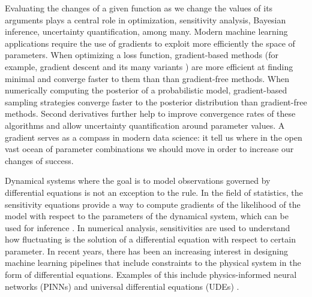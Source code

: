 Evaluating the changes of a given function as we change the values of its arguments plays a central role in optimization, sensitivity analysis, Bayesian inference, uncertainty quantification, among many. 
Modern machine learning applications require the use of gradients to exploit more efficiently the space of parameters. 
When optimizing a loss function, gradient-based methods (for example, gradient descent and its many variants \cite{ruder2016overview-gradient-descent}) are more efficient at finding minimal and converge faster to them than than gradient-free methods.
When numerically computing the posterior of a probabilistic model, gradient-based sampling strategies converge faster to the posterior distribution than gradient-free methods. 
Second derivatives further help to improve convergence rates of these algorithms and allow uncertainty quantification around parameter values.
A gradient serves as a compass in modern data science: it tell us where in the open vast ocean of parameter combinations we should move in order to increase our changes of success.  

Dynamical systems where the goal is to model observations governed by differential equations is not an exception to the rule.
In the field of statistics, the sensitivity equations provide a way to compute gradients of the likelihood of the model with respect to the parameters of the dynamical system, which can be used for inference \cite{ramsay2017dynamic}. 
In numerical analysis, sensitivities are used to understand how fluctuating is the solution of a differential equation with respect to certain parameter. 
In recent years, there has been an increasing interest in designing machine learning pipelines that include constraints to the physical system in the form of differential equations. 
Examples of this include physics-informed neural networks (PINNs) \cite{PINNs_2019} and universal differential equations (UDEs) \cite{rackauckas2020universal}.  


